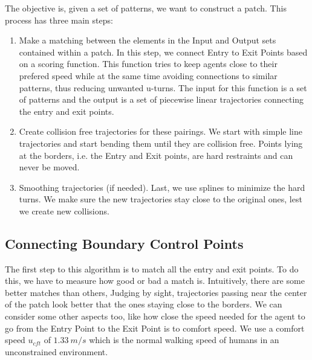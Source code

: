 The objective is, given a set of patterns, we want to construct a patch.
This process has three main steps:
\begin{enumerate}
  \item Make a matching between the elements in the Input and Output sets contained within a patch. In this step, we connect Entry to Exit Points based on a scoring function. This function tries to keep agents close to their prefered speed while at the same time avoiding connections to similar patterns, thus reducing unwanted u-turns.  The input for this function is a set of patterns and the output is a set of piecewise linear trajectories connecting the entry and exit points.
  \item Create collision free trajectories for these pairings. We start with simple line trajectories and start bending them until they are collision free. Points lying at the borders, i.e. the Entry and Exit points, are hard restraints and can never be moved.
  \item Smoothing trajectories (if needed).  Last, we use splines to minimize the hard turns. We make sure the new trajectories stay close to the original ones, lest we create new collisions.
\end{enumerate}



\subsection{Connecting Boundary Control Points}
\label{sec:method:init}

The first step to this algorithm is to match all the entry and exit points.  To do this, we have to measure how good or bad a match is. Intuitively, there are some better matches than others, Judging by sight, trajectories passing near the center of the patch look better that the ones staying close to the borders. We can consider some other aspects too, like how close the speed needed for the agent to go from the Entry Point to the Exit Point is to comfort speed. We use a comfort speed $u_{cft}$ of $1.33~m/s$ which is the normal walking speed of humans in an unconstrained environment.

